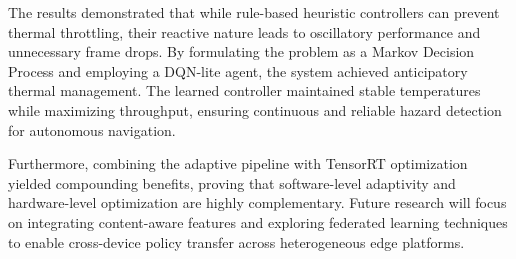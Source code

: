 \documentclass{ieeeaccess}
\begin{document}
The results demonstrated that while rule-based heuristic controllers can prevent thermal throttling, their reactive nature leads to oscillatory performance and unnecessary frame drops. By formulating the problem as a Markov Decision Process and employing a DQN-lite agent, the system achieved anticipatory thermal management. The learned controller maintained stable temperatures while maximizing throughput, ensuring continuous and reliable hazard detection for autonomous navigation.

Furthermore, combining the adaptive pipeline with TensorRT optimization yielded compounding benefits, proving that software-level adaptivity and hardware-level optimization are highly complementary. Future research will focus on integrating content-aware features and exploring federated learning techniques to enable cross-device policy transfer across heterogeneous edge platforms.
\end{document}
